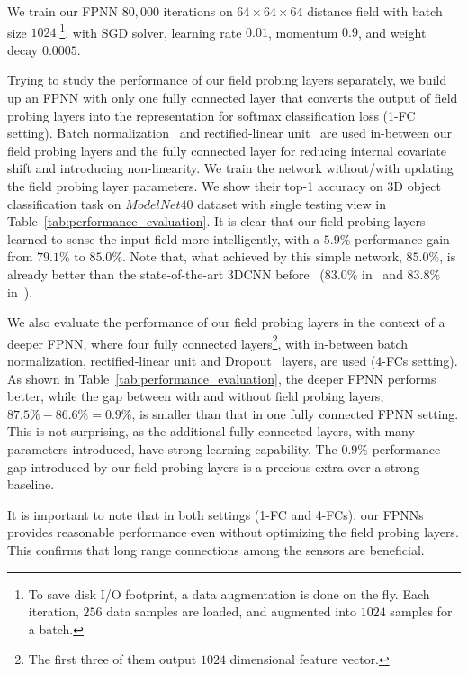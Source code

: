 \documentclass{article}
\begin{document}
We train our FPNN $80,000$ iterations on $64 \times 64 \times 64$ distance field with batch size $1024$.\footnote{To save disk I/O footprint, a data augmentation is done on the fly. Each iteration, $256$ data samples are loaded, and augmented into $1024$ samples for a batch.}, with SGD solver, learning rate $0.01$, momentum $0.9$, and weight decay $0.0005$.

Trying to study the performance of our field probing layers separately, we build up an FPNN with only one fully connected layer that converts the output of field probing layers into the representation for softmax classification loss (1-FC setting). Batch normalization~\cite{ioffe2015batch} and rectified-linear unit~\cite{nair2010rectified} are used in-between our field probing layers and the fully connected layer for reducing internal covariate shift and introducing non-linearity. We train the network without/with updating the field probing layer parameters. We show their top-1 accuracy on 3D object classification task on $ModelNet40$ dataset with single testing view in Table~\ref{tab:performance_evaluation}. It is clear that our field probing layers learned to sense the input field more intelligently, with a $5.9\%$ performance gain from $79.1\%$ to $85.0\%$. Note that, what achieved by this simple network, $85.0\%$, is already better than the state-of-the-art 3DCNN before~\cite{qi2016volumetric} ($83.0\%$ in~\cite{WU_CVPR15_3D} and $83.8\%$ in~\cite{Maturana_IROS15_VoxNet}).

We also evaluate the performance of our field probing layers in the context of a deeper FPNN, where four fully connected layers\footnote{The first three of them output $1024$ dimensional feature vector.}, with in-between batch normalization, rectified-linear unit and Dropout~\cite{srivastava2014dropout} layers, are used (4-FCs setting). As shown in Table~\ref{tab:performance_evaluation}, the deeper FPNN performs better, while the gap between with and without field probing layers, $87.5\%-86.6\%=0.9\%$, is smaller than that in one fully connected FPNN setting. This is not surprising, as the additional fully connected layers, with many parameters introduced, have strong learning capability. The $0.9\%$ performance gap introduced by our field probing layers is a precious extra over a strong baseline.

It is important to note that in both settings (1-FC and 4-FCs), our FPNNs provides reasonable performance even without optimizing the field probing layers. This confirms that long range connections among the sensors are beneficial.
\end{document}

